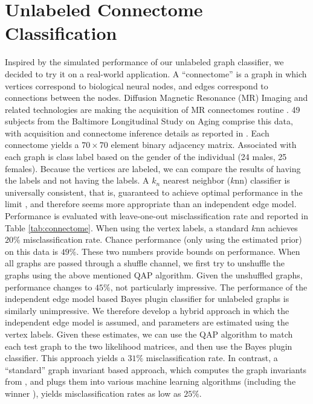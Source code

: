 \documentclass[10pt,journal,cspaper,compsoc]{IEEEtran}
\begin{document}


\section{Unlabeled Connectome Classification} %
\label{sub:connectome_classification}

Inspired by the simulated performance of our unlabeled graph classifier, we decided to try it on a real-world application.  A ``connectome'' is a graph in which vertices correspond to biological neural nodes, and edges correspond to connections between the nodes.  Diffusion Magnetic Resonance (MR) Imaging and related technologies are making the acquisition of MR connectomes routine \cite{Hagmann2010}.  49 subjects from the Baltimore Longitudinal Study on Aging comprise this data, with acquisition and connectome inference details as reported in \cite{Gray11}.  Each connectome yields a $70 \times 70$ element binary adjacency matrix.  Associated with each graph is class label based on the gender of the individual (24 males, 25 females).  Because the vertices are labeled, we can compare the results of having the labels and not having the labels.  A $k_n$ nearest neighbor ($k$nn) classifier is universally consistent, that is, guaranteed to achieve optimal performance in the limit \cite{Stone1977}, and therefore seems more appropriate than an independent edge model.  Performance is evaluated with leave-one-out misclassification rate and reported in Table \ref{tab:connectome}. When using the vertex labels, a standard $k$nn achieves $20\%$ misclassification rate.  Chance performance (only using the estimated prior) on this data is $49\%$.  These two numbers provide bounds on performance.  When all graphs are passed through a shuffle channel, we first try to unshuffle the graphs using the above mentioned QAP algorithm.  Given the unshuffled graphs, performance changes to $45\%$, not particularly impressive.  The performance of the independent edge model based Bayes plugin classifier for unlabeled graphs is similarly unimpressive.  We therefore develop a hybrid approach in which the independent edge model is assumed, and parameters are estimated using the vertex labels.  Given these estimates, we can use the QAP algorithm to match each test graph to the two likelihood matrices, and then use the Bayes plugin classifier.  This approach yields a $31\%$ misclassification rate. In contrast, a ``standard'' graph invariant based approach, which computes the graph invariants from \cite{PCP10}, and plugs them into various machine learning algorithms (including the winner \cite{Crammer2008}), yields misclassification rates as low as $25\%$. 
\end{document}
